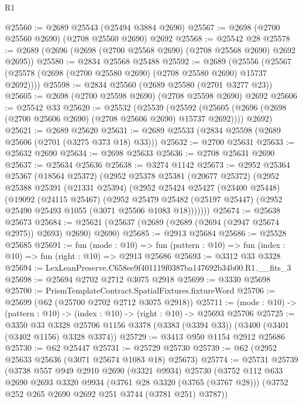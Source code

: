 \begin{lexlean}{R1}
\begin{coremodule}
@25560 := @2689 @25543 (@25494 @3884 @2690)
@25567 := @2698 (@2700 @25560 @2690) (@2708 @25560 @2690) @2692
@25568 := @25542 @28
@25578 := @2689 (@2696 (@2698 (@2700 @25568 @2690) (@2708 @25568 @2690) @2692 @2695))
@25580 := @2834 @25568 @25488
@25592 := @2689
    (@25556 (@25567 (@25578 (@2698 (@2700 @25580 @2690) (@2708 @25580 @2690) @15737 @2692))))
@25598 := @2834 @25560 (@2689 @25580 (@2701 @3277 @23))
@25605 := @2698 (@2700 @25598 @2690) (@2708 @25598 @2690) @2692
@25606 := @25542 @33
@25620 := @25532
    (@25539
      (@25592 (@25605 (@2696 (@2698 (@2700 @25606 @2690) (@2708 @25606 @2690) @15737 @2692))))
      @2692)
@25621 := @2689 @25620
@25631 := @2689 @25533 (@2834 @25598 (@2689 @25606 (@2701 (@3275 @373 @18) @33)))
@25632 := @2700 @25631
@25633 := @25632 @2690
@25634 := @2698 @25633
@25636 := @2708 @25631 @2690
@25637 := @25634 @25636
@25638 := @3274 @1142
@25673 := @2952
    @25364
    @25367
    (@18564 @25372)
    (@2952
      @25378
      @25381
      (@20677 @25372)
      (@2952
        @25388
        @25391
        (@21331 @25394)
        (@2952
          @25424
          @25427
          (@23400 @25448)
          (@19092
            (@24115 @25467)
            (@2952
              @25479
              @25482
              (@25197 @25447)
              (@2952 @25490 @25493 @1055 (@3071 @25506 @1083 @18)))))))
@25674 := @25638 @25673
@25684 := @25621 (@25637 (@2689 (@2689 (@2694 (@2947 @25674 @2975)) @2693) @2690) @2690)
@25685 := @2913 @25684
@25686 := @25528 @25685
@25691 := fun (mode : @10) =>
  fun (pattern : @10) => fun (index : @10) => fun (right : @10) => @2913 @25686
@25693 := @3312 @33 @3328
@25694 := LexLeanPreserve.C658ee9f401119f0387ba147692b34b00.R1.__fits_3
@25698 := @25694 @2702 @2712 @3075 @2918
@25699 := @3330 @25698
@25700 := PrismTemplateContract.SpatialFixtures.fixtureWord
@25706 := @25699 (@62 (@25700 @2702 @2712 @3075 @2918))
@25711 := (mode : @10) -> (pattern : @10) -> (index : @10) -> (right : @10) -> @25693 @25706
@25725 := @3350
    @33
    @3328
    @25706
    @1156
    @3378
    (@3383 (@3394 @33))
    (@3400 (@3401 (@3402 @1156) @3328 @3374))
@25729 := @3413 @950 @1154 @2912 @25686
@25730 := @62 @25447
@25731 := @25729 @25730
@25739 := @62 (@2952 @25633 @25636 (@3071 @25674 @1083 @18) @25673)
@25774 := @25731
    @25739
    (@3738
      @557
      @949
      @2910
      @2690
      (@3321 @9934)
      @25730
      (@3752
        @112
        @633
        @2690
        @2693
        @3320
        @9934
        (@3761 @28 @3320 (@3765 (@3767 @28)))
        (@3752 @252 @265 @2690 @2692 @251 @3744 (@3781 @251) @3787))

\end{coremodule}
\end{lexlean}
